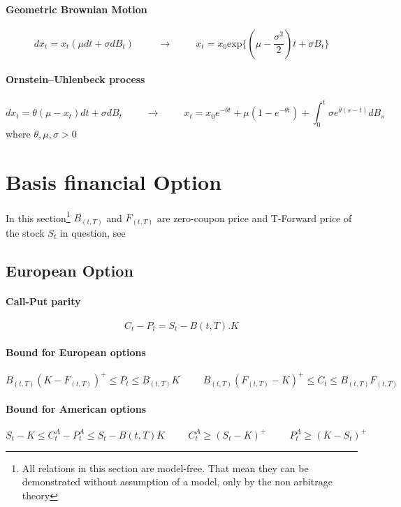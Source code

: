 \documentclass[a4paper,10pt]{article}
\begin{document}
\paragraph{Geometric Brownian Motion}
\[
dx_t = x_t (\mu dt + \sigma dB_t ) 
\hspace{1cm} \longrightarrow \hspace{1cm}
x_t = x_0\text{exp}\{(\mu-\frac{\sigma^2}{2})t +\sigma B_t  \}
\]
\paragraph{Ornstein–Uhlenbeck process}
\[
dx_t = \theta (\mu-x_t) dt + \sigma dB_t
\hspace{1cm} \longrightarrow \hspace{1cm}
x_t = x_0e^{-\theta t} + \mu(1-e^{-\theta t}) +\int_0^t \sigma e^{\theta(s-t)}dB_s
\]
where $\theta,\mu,\sigma >0$





\section{Basis financial Option}
In this section\footnote{ All relations in this section are model-free. That mean they can be demonstrated without assumption of a model, only by the non arbitrage theory} $B_{(t,T)}$ and $F_{(t,T)}$ are zero-coupon price and T-Forward price of the stock $S_t$ in question, see  ~\cite{HULL} 
\subsection{European Option}
\paragraph{Call-Put parity} 
\[
C_t - P_t = S_t - B(t,T).K
\]
\paragraph{Bound for European options}
\[
B_{(t,T)}(K-F_{(t,T)})^+ \leq P_t \leq B_{(t,T)}K 
\hspace{1cm}
B_{(t,T)}(F_{(t,T)}-K)^+ \leq C_t \leq B_{(t,T)}F_{(t,T)}
\]
\paragraph{Bound for American options}
\[
S_t - K \leq C^A_t - P^A_t \leq S_t - B(t,T)K
\hspace{1cm}
C^A_t \geq (S_t - K)^+
\hspace{1cm}
P^A_t \geq (K - S_t)^+
\]
\end{document}

